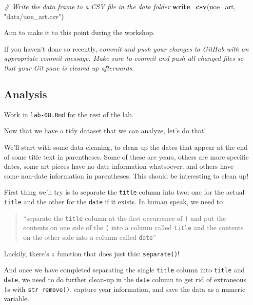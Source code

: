 \documentclass[
]{article}
\newenvironment{Shaded}{\begin{snugshade}}{\end{snugshade}}
\newcommand{\CommentTok}[1]{\textcolor[rgb]{0.56,0.35,0.01}{\textit{#1}}}
\newcommand{\FunctionTok}[1]{\textcolor[rgb]{0.13,0.29,0.53}{\textbf{#1}}}
\newcommand{\NormalTok}[1]{#1}
\newcommand{\StringTok}[1]{\textcolor[rgb]{0.31,0.60,0.02}{#1}}
\begin{document}
\begin{Shaded}
\begin{Highlighting}[]
\CommentTok{\# Write the data frame to a CSV file in the data folder}
\FunctionTok{write\_csv}\NormalTok{(uoe\_art, }\StringTok{"data/uoe\_art.csv"}\NormalTok{)}
\end{Highlighting}
\end{Shaded}

Aim to make it to this point during the workshop.

If you haven't done so recently, c\emph{ommit and push your changes to
GitHub with an appropriate commit message. Make sure to commit and push
all changed files so that your Git pane is cleared up afterwards.}

\subsection{Analysis}\label{analysis}

Work in \texttt{lab-08.Rmd} for the rest of the lab.

Now that we have a tidy dataset that we can analyze, let's do that!

We'll start with some data cleaning, to clean up the dates that appear
at the end of some title text in parentheses. Some of these are years,
others are more specific dates, some art pieces have no date information
whatsoever, and others have some non-date information in parentheses.
This should be interesting to clean up!

First thing we'll try is to separate the \texttt{title} column into two:
one for the actual \texttt{title} and the other for the \texttt{date} if
it exists. In human speak, we need to

\begin{quote}
``separate the \texttt{title} column at the first occurrence of
\texttt{(} and put the contents on one side of the \texttt{(} into a
column called \texttt{title} and the contents on the other side into a
column called \texttt{date}''
\end{quote}

Luckily, there's a function that does just this: \texttt{separate()}!

And once we have completed separating the single \texttt{title} column
into \texttt{title} and \texttt{date}, we need to do further clean-up in
the \texttt{date} column to get rid of extraneous \texttt{)}s with
\texttt{str\_remove()}, capture year information, and save the data as a
numeric variable.
\end{document}
